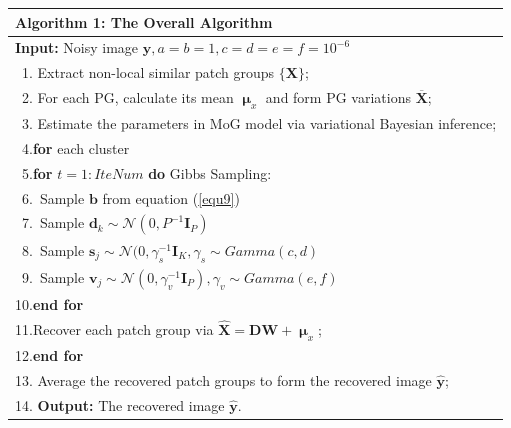 \documentclass[runningheads]{llncs}
\begin{document}
\begin{table}[t]
\centering
\label{alg}
\begin{tabular}{l}
\hline
\textbf{Algorithm 1}: The Overall Algorithm
\\
\hline
\textbf{Input:} Noisy image $\mathbf{y}, a=b=1,c=d=e=f=10^{-6}$
\\
\ 1. Extract non-local similar patch groups $\{\mathbf{X}\}$;
\\
\ 2. For each PG, calculate its mean $\boldsymbol{\upmu}_{x}$ and form PG variations $\mathbf{\overline{X}}$;
\\
\ 3. Estimate the parameters in MoG model via variational Bayesian inference;
\\
\ 4.\quad \textbf{for} each cluster
\\
\ 5.\quad\quad \textbf{for} $t = 1:IteNum$ \textbf{do} Gibbs Sampling:
\\
\ 6.\quad\quad\quad\ Sample $\mathbf{b}$ from equation (\ref{equ9})
\\
\ 7.\quad\quad\quad\ Sample $\mathbf{d}_{k}\sim\mathcal{N}(0,P^{-1}\mathbf{I}_{P})$
\\
\ 8.\quad\quad\quad\ Sample $\mathbf{s}_{j} \sim \mathcal{N}(0,\gamma_{s}^{-1}\mathbf{I}_{K}, \gamma_{s}\sim Gamma(c,d)$
\\
\ 9.\quad\quad\quad\ Sample $\mathbf{v}_{j}\sim\mathcal{N}(0,\gamma_{v}^{-1}\mathbf{I}_{P}), \gamma_{v}\sim Gamma(e,f)$
\\
10.\quad\quad\textbf{end for}
\\
11.\quad Recover each patch group via $\hat{\mathbf{X}}=\mathbf{D}\mathbf{W}+\boldsymbol{\upmu}_{x}$;
\\
12.\quad \textbf{end for}
\\
13. Average the recovered patch groups to form the recovered image $\hat{\mathbf{y}}$;
\\
14. \textbf{Output:} The recovered image $\hat{\mathbf{y}}$.\\
\hline
\end{tabular}
\end{table}

\vspace{-0.1in}

\end{document}
